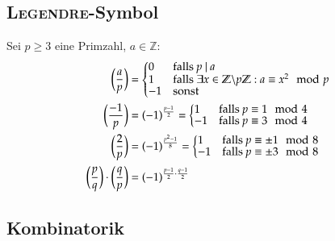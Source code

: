 \subsection{\textsc{Legendre}-Symbol}
Sei $p \geq 3$ eine Primzahl, $a \in \mathbb{Z}$:
\begin{align*}
	\legendre{a}{p} &=
	\begin{cases*}
		 0 & falls $p~\vert~a$ \\[-1ex]
		 1 & falls $\exists x \in \mathbb{Z}\backslash p\mathbb{Z} : a \equiv x^2 \mod p$ \\[-1ex]
		-1 & sonst
	\end{cases*} \\
	\legendre{-1}{p} &= (-1)^{\frac{p - 1}{2}} =
	\begin{cases*}
		 1 & falls $p \equiv 1 \mod 4$ \\[-1ex]
		-1 & falls $p \equiv 3 \mod 4$
	\end{cases*} \\
	\legendre{2}{p} &= (-1)^{\frac{p^2 - 1}{8}} =
	\begin{cases*}
		 1 & falls $p \equiv \pm 1 \mod 8$ \\[-1ex]
		-1 & falls $p \equiv \pm 3 \mod 8$
	\end{cases*} \\
	\legendre{p}{q} \cdot \legendre{q}{p} &=
	(-1)^{\frac{p - 1}{2} \cdot \frac{q - 1}{2}}
\end{align*}


\subsection{Kombinatorik}

